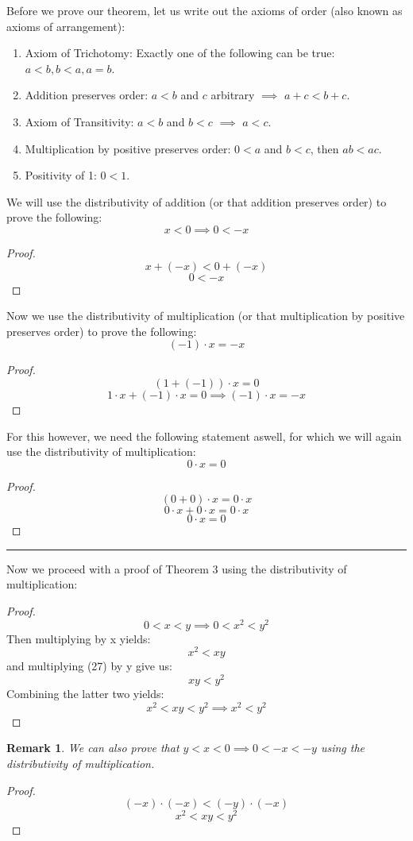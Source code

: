 \documentclass{article}
\newtheorem*{remark}{Remark}
\begin{document}
Before we prove our theorem, let us write out the axioms of order (also known as axioms of arrangement):
\begin{enumerate}
    \item Axiom of Trichotomy: Exactly one of the following can be true: $a < b, b < a, a = b$.
    \item Addition preserves order: $a < b$ and $c$ arbitrary $\implies$ $a + c < b + c$.
    \item  Axiom of Transitivity: $a < b$ and $b < c$ $\implies$ $a < c$.
    \item Multiplication by positive preserves order: $0 < a$ and $b < c$, then $ab < ac$.
    \item Positivity of 1: $0 < 1$.
\end{enumerate}
We will use the distributivity of addition (or that addition preserves order) to prove the following:
\[
    x < 0 \implies 0 < -x
\]
\begin{proof}
\[
    x + (-x) < 0 + (-x)
\]
\[
    0 < -x
\]
\end{proof}
Now we use the distributivity of multiplication (or that multiplication by positive preserves order) to prove the following:
\[
    (-1)\cdot x = -x
\]
\begin{proof}
\[
    (1 + (-1)) \cdot x = 0
\]
\[
    1 \cdot x + (-1) \cdot x = 0 \implies (-1) \cdot x = -x
\]
\end{proof}
For this however, we need the following statement aswell, for which we will again use the distributivity of multiplication:
\[
    0\cdot x = 0
\]
\begin{proof}
\[
    (0+0) \cdot x = 0 \cdot x
\]
\[
    0 \cdot x + 0 \cdot x = 0 \cdot x
\]
\[
    0 \cdot x = 0
\]
\end{proof}

\hrule
\vspace{1em}

Now we proceed with a proof of Theorem 3 using the distributivity of multiplication:

\begin{proof}
    \begin{equation}
    0 < x < y \implies 0 < x^2 < y^2
    \end{equation}
    Then multiplying by x yields:
    \[
    x^2 < xy
    \]
    and multiplying (27) by y give us:
    \[
    xy < y^2
    \]
    Combining the latter two yields:
    \[
    x^2 < xy < y^2 \implies x^2 < y^2
    \]
\end{proof}

\begin{remark}
    We can also prove that $y < x < 0 \implies 0 < -x < -y$ using the distributivity of multiplication.
\end{remark}

\begin{proof}
    \[
    (-x) \cdot (-x) < (-y) \cdot (-x)
    \]
    \[
    x^2 < xy < y^2
    \]
\end{proof}
\end{document}
